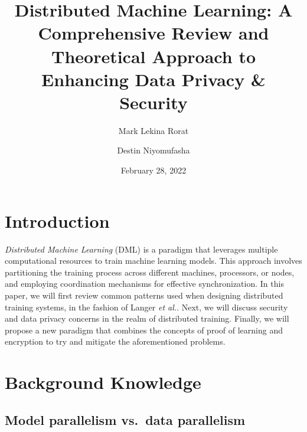 \documentclass[11pt]{article}
\begin{document}
\title{Distributed Machine Learning: A Comprehensive Review and Theoretical Approach to Enhancing Data Privacy \& Security}

\author{Mark Lekina Rorat}
\author{Destin Niyomufasha}


\date{February 28, 2022}

\maketitle

\section*{Introduction}

\textit{Distributed Machine Learning} (DML) is a paradigm that leverages multiple computational resources to train machine learning models. This approach involves partitioning the training process across different machines, processors, or nodes, and employing coordination mechanisms for effective synchronization. In this paper, we will first review common patterns used when designing distributed training systems, in the fashion of Langer \textit{et al.}\cite{langer2020distributed}. Next, we will discuss security and data privacy concerns in the realm of distributed training. Finally, we will propose a new paradigm that combines the concepts of proof of learning and encryption to try and mitigate the aforementioned problems.

\section*{Background Knowledge}
\subsection*{Model parallelism vs.\ data parallelism}
\end{document}
